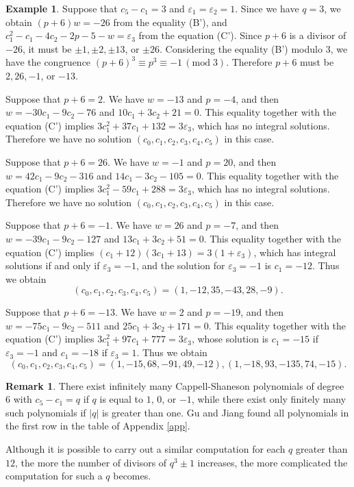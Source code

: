 \documentclass{amsart}
\theoremstyle{plain}
\theoremstyle{definition}
\newtheorem{exmp}[thm]{Example}
\newtheorem{rem}[thm]{Remark}
\theoremstyle{remark}
\begin{document}
\begin{exmp}
Suppose that $c_5-c_1=3$ and $\varepsilon_1=\varepsilon_2=1$. 
Since we have $q=3$, we obtain $(p+6)w=-26$ from the equality (B'), 
and $c_1^2-c_1-4c_2-2p-5-w=\varepsilon_3$ from the equation (C'). 
Since $p+6$ is a divisor of $-26$, it must be $\pm 1,\pm 2,\pm 13$, or $\pm 26$. 
Considering the equality (B') modulo $3$, we have the congruence 
$(p+6)^3\equiv p^3\equiv -1\, (\textrm{mod}\; 3)$. Therefore $p+6$ must be $2,26,-1$, or $-13$. 

Suppose that $p+6=2$. 
We have $w=-13$ and $p=-4$, and then $w=-30c_1-9c_2-76$ and $10c_1+3c_2+21=0$. 
This equality together with the equation (C') implies $3c_1^2+37c_1+132=3\varepsilon_3$, 
which has no integral solutions. 
Therefore we have no solution $(c_0,c_1,c_2,c_3,c_4,c_5)$ in this case. 

Suppose that $p+6=26$. 
We have $w=-1$ and $p=20$, and then $w=42c_1-9c_2-316$ and $14c_1-3c_2-105=0$. 
This equality together with the equation (C') implies $3c_1^2-59c_1+288=3\varepsilon_3$, 
which has no integral solutions. 
Therefore we have no solution $(c_0,c_1,c_2,c_3,c_4,c_5)$ in this case. 

Suppose that $p+6=-1$. 
We have $w=26$ and $p=-7$, and then $w=-39c_1-9c_2-127$ and $13c_1+3c_2+51=0$. 
This equality together with the equation (C') implies $(c_1+12)(3c_1+13)=3(1+\varepsilon_3)$, 
which has integral solutions if and only if $\varepsilon_3=-1$, and 
the solution for $\varepsilon_3=-1$ is $c_1=-12$. 
Thus we obtain 
\[
(c_0,c_1,c_2,c_3,c_4,c_5)=(1,-12,35,-43,28,-9). 
\]

Suppose that $p+6=-13$. 
We have $w=2$ and $p=-19$, and then $w=-75c_1-9c_2-511$ and $25c_1+3c_2+171=0$. 
This equality together with the equation (C') implies $3c_1^2+97c_1+777=3\varepsilon_3$, 
whose solution is $c_1=-15$ if $\varepsilon_3=-1$ and $c_1=-18$ if $\varepsilon_3=1$. 
Thus we obtain 
\[
(c_0,c_1,c_2,c_3,c_4,c_5)=(1,-15,68,-91,49,-12), (1,-18,93,-135,74,-15). 
\]
\end{exmp}

\begin{rem}
There exist infinitely many Cappell-Shaneson polynomials of degree $6$ with $c_5-c_1=q$ 
if $q$ is equal to $1$, $0$, or $-1$, while there exist only finitely many such polynomials 
if $|q|$ is greater than one. 
Gu and Jiang \cite{GJ1999} found 
all polynomials in the first row in the table of Appendix \ref{app}. 
\end{rem}

Although it is possible to carry out a similar computation for each $q$ greater than $12$, 
the more the number of divisors of $q^3\pm 1$ increases, 
the more complicated the computation for such a $q$ becomes. 
\end{document}
